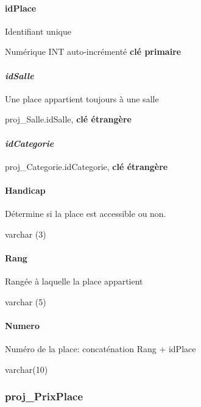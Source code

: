 \paragraph{\texorpdfstring{\textbf{idPlace}}{idPlace}}\label{idplace}

Identifiant unique

Numérique INT auto-incrémenté \textbf{clé primaire}

\paragraph{\texorpdfstring{\emph{idSalle}}{idSalle}}\label{idsalle-3}

Une place appartient toujours à une salle

proj\_Salle.idSalle, \textbf{clé étrangère}

\paragraph{\texorpdfstring{\emph{idCategorie}}{idCategorie}}\label{idcategorie-1}

proj\_Categorie.idCategorie, \textbf{clé étrangère}

\paragraph{Handicap}\label{handicap}

Détermine si la place est accessible ou non.

varchar (3)

\paragraph{Rang}\label{rang}

Rangée à laquelle la place appartient

varchar (5)

\paragraph{Numero}\label{numero}

Numéro de la place: concaténation Rang + idPlace

varchar(10)

\subsubsection{proj\_PrixPlace}\label{projux5fprixplace}

